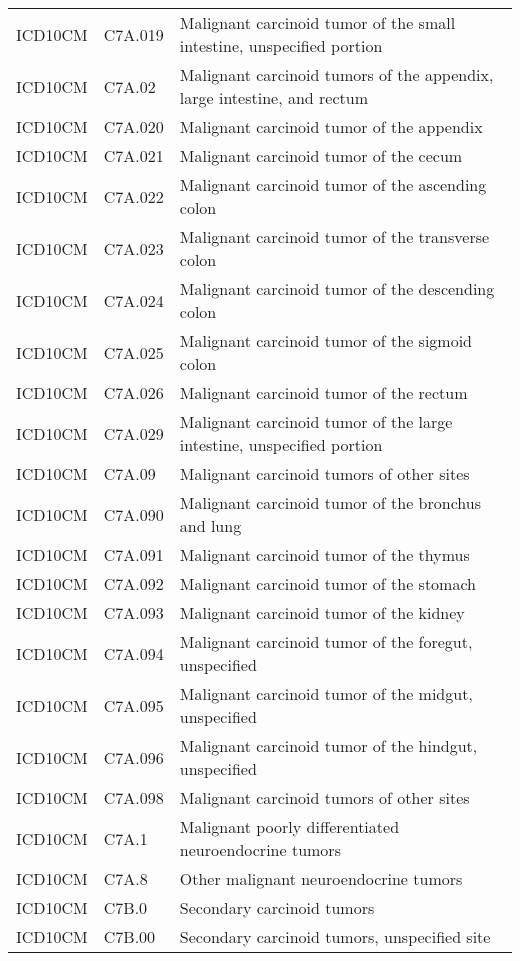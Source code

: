 \begin{longtable}{p{}p{}p{}}
  ICD10CM & C7A.019 & Malignant carcinoid tumor of the small intestine, unspecified portion \\ 
  ICD10CM & C7A.02 & Malignant carcinoid tumors of the appendix, large intestine, and rectum \\ 
  ICD10CM & C7A.020 & Malignant carcinoid tumor of the appendix \\ 
  ICD10CM & C7A.021 & Malignant carcinoid tumor of the cecum \\ 
  ICD10CM & C7A.022 & Malignant carcinoid tumor of the ascending colon \\ 
  ICD10CM & C7A.023 & Malignant carcinoid tumor of the transverse colon \\ 
  ICD10CM & C7A.024 & Malignant carcinoid tumor of the descending colon \\ 
  ICD10CM & C7A.025 & Malignant carcinoid tumor of the sigmoid colon \\ 
  ICD10CM & C7A.026 & Malignant carcinoid tumor of the rectum \\ 
  ICD10CM & C7A.029 & Malignant carcinoid tumor of the large intestine, unspecified portion \\ 
  ICD10CM & C7A.09 & Malignant carcinoid tumors of other sites \\ 
  ICD10CM & C7A.090 & Malignant carcinoid tumor of the bronchus and lung \\ 
  ICD10CM & C7A.091 & Malignant carcinoid tumor of the thymus \\ 
  ICD10CM & C7A.092 & Malignant carcinoid tumor of the stomach \\ 
  ICD10CM & C7A.093 & Malignant carcinoid tumor of the kidney \\ 
  ICD10CM & C7A.094 & Malignant carcinoid tumor of the foregut, unspecified \\ 
  ICD10CM & C7A.095 & Malignant carcinoid tumor of the midgut, unspecified \\ 
  ICD10CM & C7A.096 & Malignant carcinoid tumor of the hindgut, unspecified \\ 
  ICD10CM & C7A.098 & Malignant carcinoid tumors of other sites \\ 
  ICD10CM & C7A.1 & Malignant poorly differentiated neuroendocrine tumors \\ 
  ICD10CM & C7A.8 & Other malignant neuroendocrine tumors \\ 
  ICD10CM & C7B.0 & Secondary carcinoid tumors \\ 
  ICD10CM & C7B.00 & Secondary carcinoid tumors, unspecified site \\ 

\end{longtable}
